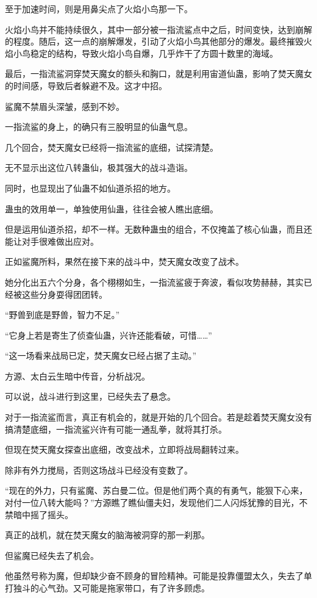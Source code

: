\begin{this_body}
至于加速时间，则是用鼻尖点了火焰小鸟那一下。

火焰小鸟并不能持续很久，其中一部分被一指流鲨点中之后，时间变快，达到崩解的程度。随后，这一点的崩解爆发，引动了火焰小鸟其他部分的爆发。最终摧毁火焰小鸟稳定的结构，导致火焰小鸟自爆，几乎炸干了方圆十数里的海域。

最后，一指流鲨洞穿焚天魔女的额头和胸口，就是利用宙道仙蛊，影响了焚天魔女的时间感，导致后者躲避不及。这才中招。

鲨魔不禁眉头深皱，感到不妙。

一指流鲨的身上，的确只有三股明显的仙蛊气息。

几个回合，焚天魔女已经将一指流鲨的底细，试探清楚。

无不显示出这位八转蛊仙，极其强大的战斗造诣。

同时，也显现出了仙蛊不如仙道杀招的地方。

蛊虫的效用单一，单独使用仙蛊，往往会被人瞧出底细。

但是运用仙道杀招，却不一样。无数种蛊虫的组合，不仅掩盖了核心仙蛊，而且还能让对手很难做出应对。

正如鲨魔所料，果然在接下来的战斗中，焚天魔女改变了战术。

她分化出五六个分身，各个栩栩如生，一指流鲨疲于奔波，看似攻势赫赫，其实已经被这些分身耍得团团转。

“野兽到底是野兽，智力不足。”

“它身上若是寄生了侦查仙蛊，兴许还能看破，可惜……”

“这一场看来战局已定，焚天魔女已经占据了主动。”

方源、太白云生暗中传音，分析战况。

可以说，战斗进行到这里，已经失去了悬念。

对于一指流鲨而言，真正有机会的，就是开始的几个回合。若是趁着焚天魔女没有搞清楚底细，一指流鲨兴许有可能一通乱拳，就将其打杀。

但现在焚天魔女探查出底细，改变战术，立即将战局翻转过来。

除非有外力搅局，否则这场战斗已经没有变数了。

“现在的外力，只有鲨魔、苏白曼二位。但是他们两个真的有勇气，能狠下心来，对付一位八转大能吗？”方源瞧了瞧仙僵夫妇，发现他们二人闪烁犹豫的目光，不禁暗中摇了摇头。

真正的战机，就在焚天魔女的脑海被洞穿的那一刹那。

但鲨魔已经失去了机会。

他虽然号称为魔，但却缺少奋不顾身的冒险精神。可能是投靠僵盟太久，失去了单打独斗的心气劲。又可能是拖家带口，有了许多顾虑。


\end{this_body}
